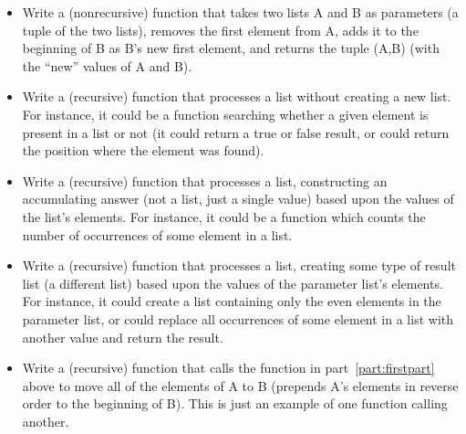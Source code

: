 \documentclass[12pt]{article}
\begin{document}
      \vspace{-1mm}

      \begin{itemize}

        \addtolength{\itemsep}{-1mm}

        \item \label{part:firstpart} Write a (nonrecursive) function that
              takes two lists A and B as parameters (a tuple of the two
              lists), removes the first element from A, adds it to the
              beginning of B as B's new first element, and returns the tuple
              (A,B) (with the ``new'' values of A and B).

        \item Write a (recursive) function that processes a list without
              creating a new list.  For instance, it could be a function
              searching whether a given element is present in a list or not
              (it could return a true or false result, or could return the
              position where the element was found).

        \item Write a (recursive) function that processes a list,
              constructing an accumulating answer (not a list, just a single
              value) based upon the values of the list's elements.  For
              instance, it could be a function which counts the number of
              occurrences of some element in a list.

        \item Write a (recursive) function that processes a list, creating
              some type of result list (a different list) based upon the
              values of the parameter list's elements.  For instance, it
              could create a list containing only the even elements in the
              parameter list, or could replace all occurrences of some
              element in a list with another value and return the result.

        \item Write a (recursive) function that calls the function in
              part~\ref{part:firstpart} above to move all of the elements of
              A to B (prepends A's elements in reverse order to the
              beginning of B).  This is just an example of one function
              calling another.

      \end{itemize}

      \vspace{-1mm}
\end{document}
